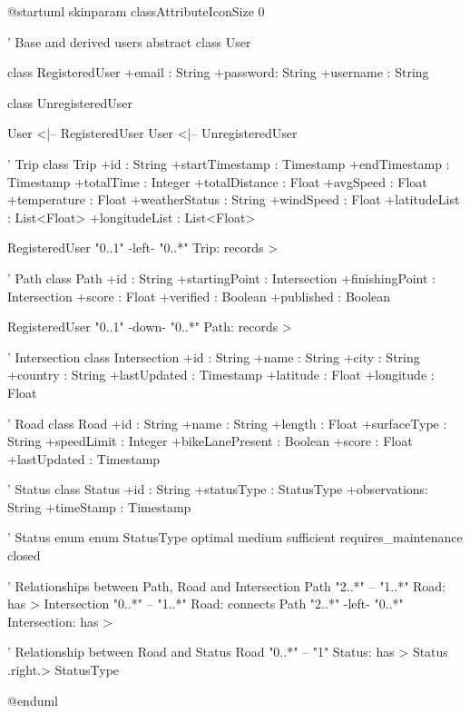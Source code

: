 @startuml
skinparam classAttributeIconSize 0

' Base and derived users
abstract class User

class RegisteredUser {
  +email : String
  +password: String
  +username : String
}

class UnregisteredUser

User <|-- RegisteredUser
User <|-- UnregisteredUser

' Trip
class Trip {
  +id : String
  +startTimestamp : Timestamp
  +endTimestamp : Timestamp
  +totalTime : Integer
  +totalDistance : Float
  +avgSpeed : Float
  +temperature : Float
  +weatherStatus : String
  +windSpeed : Float
  +latitudeList : List<Float>
  +longitudeList : List<Float>
}

RegisteredUser "0..1" -left- "0..*" Trip: records >

' Path
class Path {
  +id : String
  +startingPoint : Intersection
  +finishingPoint : Intersection
  +score : Float
  +verified : Boolean
  +published : Boolean
}

RegisteredUser "0..1" -down- "0..*" Path: records >

' Intersection
class Intersection {
  +id : String
  +name : String
  +city : String
  +country : String
  +lastUpdated : Timestamp
  +latitude : Float
  +longitude : Float
}

' Road
class Road {
  +id : String
  +name : String
  +length : Float
  +surfaceType : String
  +speedLimit : Integer
  +bikeLanePresent : Boolean
  +score : Float
  +lastUpdated : Timestamp
}

' Status
class Status {
  +id : String
  +statusType : StatusType
  +observations: String
  +timeStamp : Timestamp
}

' Status enum
enum StatusType {
optimal
medium
sufficient
requires_maintenance
closed
}


' Relationships between Path, Road and Intersection
Path "2..*" -- "1..*" Road: has >
Intersection "0..*" -- "1..*" Road: connects 
Path "2..*" -left- "0..*" Intersection: has >

' Relationship between Road and Status
Road "0..*" -- "1" Status: has >
Status .right.> StatusType

@enduml